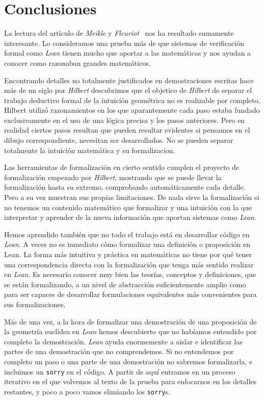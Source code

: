 \section{Conclusiones}

La lectura del artículo de \textit{Meikle} y
\textit{Fleuriot}~\cite{meikleFormalizingHilbertGrundlagen2003} nos ha resultado
sumamente interesante. Lo consideramos una prueba más de que sistemas de
verificación formal como \textit{Lean} tienen mucho que aportar a las matemáticas
y nos ayudan a conocer como razonaban grandes matemáticos.

Encontrando detalles no totalmente justificados en demostraciones escritas hace
más de un siglo por \textit{Hilbert} descubrimos que el objetico de
\textit{Hilbert} de separar el trabajo deductivo formal de la intuición
geométrica no es realizable por completo. Hilbert utilizó razonamientos
en los que aparantemente cada paso estaba fundado exclusivamente en el uso de
una lógica precisa y los pasos anteriores. Pero en realidad ciertos pasos
resultan que pueden resultar evidentes si pensamos en el dibujo correspondiente,
necesitan ser desarrollados. No se pueden separar totalmente la intuición
matemática y su formalizacion.

Las herramientas de formalización en cierto sentido cumplen el proyecto de
formalización empezado por \textit{Hilbert}, mostrando que se puede llevar la
formalización hasta su extremo, comprobando automáticamente cada detalle. Pero a
su vez muestran sus propias limitaciones. De nada sirve la formalización si no
tenemos un contenido matemático que formalizar y una intuición con la que
interpretar y aprender de la nueva información que aportan sistemas como
\textit{Lean}.

Hemos aprendido también que no todo el trabajo está en desarrollar código en
\textit{Lean}. A veces no es inmediato cómo formalizar una definición o
proposición en Lean. La forma más intuitiva y práctica en matemáticas no tiene
por qué tener una correspondencia directa con la formalización que tenga más
sentido realizar en \textit{Lean}. Es necesario conocer muy bien las teorías,
conceptos y definiciones, que se están formalizando, a un nivel de abstracción
suficientemente amplio como para ser capaces de desarrollar formulaciones
equivalentes más convenientes para sus formalizaciones.

Más de una vez, a la hora de formalizar una demostración de una proposición de
la geometría euclídea en \textit{Lean} hemos descubierto que no habíamos
entendido por completo la demostración. \textit{Lean} ayuda enormemente a aislar
e identificar las partes de una demostración que no comprendemos. Si no
entendemos por completo un paso o una parte de una demostración no sabremos
formalizarla, e incluimos un \lstinline{sorry} en el código. A partir de aquí
entramos en un proceso iterativo en el que volvemos al texto de la prueba para
enfocarnos en los detalles restantes, y poco a poco vamos elimiando los
\lstinline{sorry}s.

